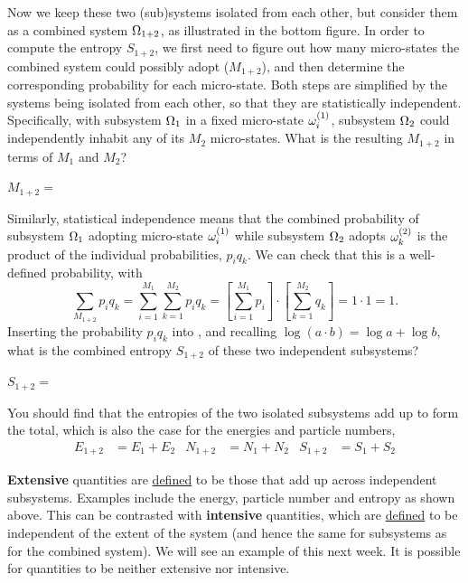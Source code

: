 Now we keep these two (sub)systems isolated from each other, but consider them as a combined system $\Omega_{1+2}$, as illustrated in the bottom figure.
In order to compute the entropy $S_{1+2}$, we first need to figure out how many micro-states the combined system could possibly adopt ($M_{1+2}$), and then determine the corresponding probability for each micro-state.
Both steps are simplified by the systems being isolated from each other, so that they are statistically independent.
Specifically, with subsystem $\Omega_1$ in a fixed micro-state $\omega_i^{(1)}$, subsystem $\Omega_2$ could independently inhabit any of its $M_2$ micro-states.
What is the resulting $M_{1+2}$ in terms of $M_1$ and $M_2$?
\begin{mdframed}
  $M_{1+2} = $ \\[50 pt]
\end{mdframed}
Similarly, statistical independence means that the combined probability of subsystem $\Omega_1$ adopting micro-state $\omega_i^{(1)}$ while subsystem $\Omega_2$ adopts $\omega_k^{(2)}$ is the product of the individual probabilities, $p_i q_k$.
We can check that this is a well-defined probability, with
\begin{equation*}
  \sum_{M_{1+2}} p_i q_k = \sum_{i = 1}^{M_1} \sum_{k = 1}^{M_2} p_i q_k = \left[\sum_{i = 1}^{M_1} p_i\right]\cdot \left[\sum_{k = 1}^{M_2} q_k\right] = 1\cdot 1 = 1.
\end{equation*}
Inserting the probability $p_i q_k$ into , and recalling $\log(a\cdot b) = \log a + \log b$, what is the combined entropy $S_{1+2}$ of these two independent subsystems?
\begin{mdframed}
  $S_{1+2} = $ \\[100 pt]
\end{mdframed}
You should find that the entropies of the two isolated subsystems add up to form the total, which is also the case for the energies and particle numbers,
\begin{align*}
  E_{1+2} & = E_1 + E_2 &
  N_{1+2} & = N_1 + N_2 &
  S_{1+2} & = S_1 + S_2
\end{align*}

\begin{shaded}
  \textbf{Extensive} quantities are \href{https://goldbook.iupac.org/terms/view/E02281}{defined} to be those that add up across independent subsystems.
  Examples include the energy, particle number and entropy as shown above.
  This can be contrasted with \textbf{intensive} quantities, which are \href{https://goldbook.iupac.org/terms/view/I03074}{defined} to be independent of the extent of the system (and hence the same for subsystems as for the combined system).
  We will see an example of this next week. %
  It is possible for quantities to be neither extensive nor intensive.
\end{shaded}

